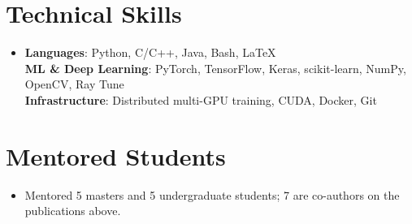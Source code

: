 \documentclass[letterpaper,11pt]{article}
\begin{document}
\vspace{-0.2in}
\section{Technical Skills}
 \begin{itemize}[leftmargin=0.0in, label={}, topsep=0pt]
    \item
     \textbf{Languages}{: Python, C/C++, Java, Bash, LaTeX} \\
     \textbf{ML \& Deep Learning}{: PyTorch, TensorFlow, Keras, scikit-learn, NumPy, OpenCV, Ray Tune} \\
     \textbf{Infrastructure}{: Distributed multi-GPU training, CUDA, Docker, Git}
 \end{itemize}

    


\vspace{-0.2in}
 \section{Mentored Students}
 \begin{itemize}[leftmargin=0.0in, label={}, topsep=0pt]
    \item
     \small{Mentored 5 masters and 5 undergraduate students; 7 are co-authors on the publications above.}
 \end{itemize}


\end{document}
